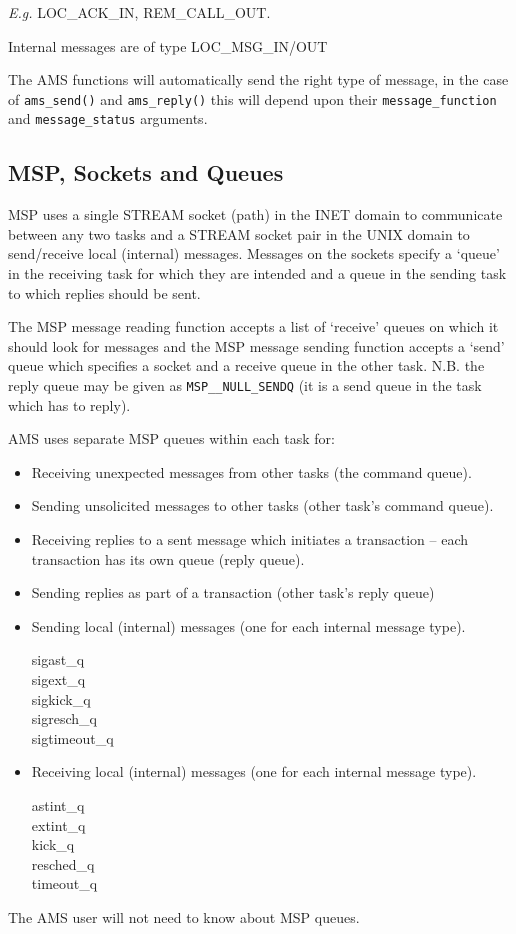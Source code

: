 \documentclass[twoside,11pt,nolof]{starlink}
\begin{document}
\textit{E.g.} LOC\_ACK\_IN, REM\_CALL\_OUT.

Internal messages are of type LOC\_MSG\_IN/OUT

The AMS functions will automatically send the right type of message, in the
case of \texttt{ams\_send()} and \texttt{ams\_reply()} this will depend upon
their \texttt{message\_function} and \texttt{message\_status} arguments.

\subsection{MSP, Sockets and Queues}
MSP uses a single STREAM socket (path) in the INET domain to communicate
between any two tasks and a STREAM socket pair in the UNIX domain to
send/receive local (internal) messages. Messages on the sockets specify a
`queue' in the receiving task for which they are intended and a queue
in the sending task to which replies should be sent.

The MSP message reading function accepts a list of `receive' queues on which it
should look for messages and the MSP message sending function accepts a `send'
queue which specifies a socket and a receive queue in the other task.
N.B. the reply queue may be given as \texttt{MSP\_\_NULL\_SENDQ} (it is a send
queue in the task which has to reply).

AMS uses separate MSP queues within each task for:
\begin{itemize}
\item Receiving unexpected messages from other tasks (the command queue).
\item Sending unsolicited messages to other tasks (other task's command queue).
\item Receiving replies to a sent message which initiates a transaction -- each
transaction has its own queue (reply queue).
\item Sending replies as part of a transaction (other task's reply queue)
\item Sending local (internal) messages (one for each internal message type).
\begin{description}
\item[sigast\_q]
\item[sigext\_q]
\item[sigkick\_q]
\item[sigresch\_q]
\item[sigtimeout\_q]
\end{description}
\item Receiving local (internal) messages (one for each internal message type).
\begin{description}
\item[astint\_q]
\item[extint\_q]
\item[kick\_q]
\item[resched\_q]
\item[timeout\_q]
\end{description}
\end{itemize}
The AMS user will not need to know about MSP queues.
\end{document}
